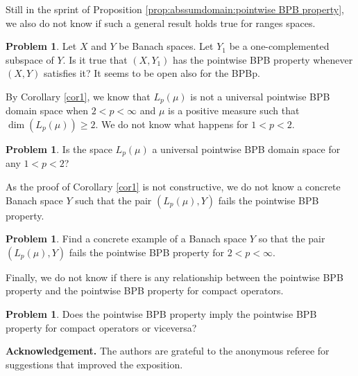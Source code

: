 \documentclass[a4paper,10pt]{amsart}
\theoremstyle{plain}
\theoremstyle{definition}
\newtheorem{problem}[theorem]{Problem}
\renewcommand{\geq}{\geqslant}
\renewcommand{\leq}{\leqslant}
\begin{document}
Still in the sprint of Proposition \ref{prop:abssumdomain:pointwise BPB property}, we also do not know if such a general result holds true for ranges spaces.

\begin{problem} Let $X$ and $Y$ be Banach spaces. Let $Y_1$ be a one-complemented subspace of $Y$. Is it true that $(X, Y_1)$ has the pointwise BPB property whenever $(X, Y)$ satisfies it? It seems to be open also for the BPBp.
\end{problem}

By Corollary \ref{cor1}, we know that $L_p(\mu)$ is not a universal pointwise BPB domain space when $2 < p < \infty$ and $\mu$ is a positive measure such that $\dim(L_p(\mu))\geq 2$. We do not know what happens for $1 < p < 2$.

\begin{problem} Is the space $L_p(\mu)$ a universal pointwise BPB domain space for any $1 < p < 2$?
\end{problem}

As the proof of Corollary \ref{cor1} is not constructive, we do not know a concrete Banach space $Y$ such that the pair $(L_p(\mu), Y)$ fails the pointwise BPB property.

\begin{problem} Find a concrete example of a Banach space $Y$ so that the pair $(L_p(\mu), Y)$ fails the pointwise BPB property for $2 < p < \infty$.
\end{problem}

%

Finally, we do not know if there is any relationship between the pointwise BPB property and the pointwise BPB property for compact operators.


\begin{problem} Does the pointwise BPB property imply the pointwise BPB property for compact operators or viceversa?
\end{problem}


{\bf Acknowledgement.} The authors  are grateful to the anonymous referee for suggestions that improved the exposition.
\end{document}
